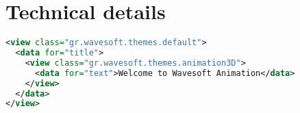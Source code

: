 \section{Technical details}

\begin{lstlisting}[language=XML]
<view class="gr.wavesoft.themes.default">
  <data for="title">
    <view class="gr.wavesoft.themes.animation3D">
      <data for="text">Welcome to Wavesoft Animation</data>
    </view>
  </data>
</view>
\end{lstlisting}
